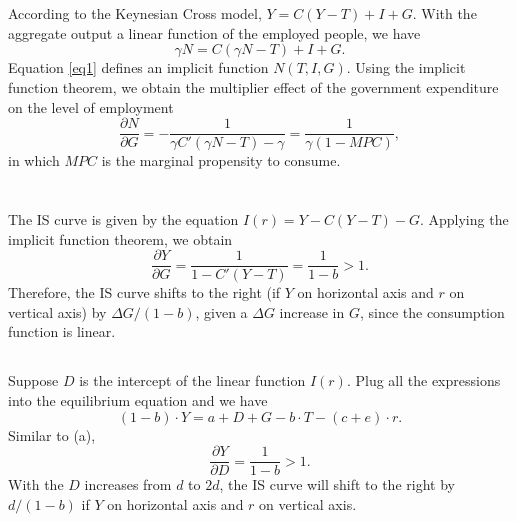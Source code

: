 \documentclass{article}
\begin{document}
\section{}
According to the Keynesian Cross model, $Y = C(Y - T) + I + G$. With the aggregate output a linear function of the employed people, we have
\begin{equation}
    \gamma N = C(\gamma N - T) + I + G.
    \label{eq1}
\end{equation}
Equation \eqref{eq1} defines an implicit function $N(T,I,G)$. Using the implicit function theorem, we obtain the multiplier effect of the government expenditure on the level of employment
\[
    \frac{\partial N}{\partial G} =
    -\frac{1}{\gamma C'(\gamma N - T) - \gamma} 
    = \frac{1}{\gamma (1 - MPC)},
\]
in which $MPC$ is the marginal propensity to consume.

\section{}
\subsection{}
The IS curve is given by the equation $I(r) = Y - C(Y - T) - G$. Applying the implicit function theorem, we obtain
\[
    \frac{\partial Y}{\partial G} = \frac{1}{1 - C'(Y-T)} = \frac{1}{1-b} > 1.
\]
Therefore, the IS curve shifts to the right (if $Y$ on horizontal axis and $r$ on vertical axis) by $\Delta G/(1-b)$, given a $\Delta G$ increase in $G$, since the consumption function is linear.

\subsection{}
Suppose $D$ is the intercept of the linear function $I(r)$. Plug all the expressions into the equilibrium equation and we have
\[
    (1 - b) \cdot Y = a + D + G - b \cdot T - (c+e) \cdot r.
\]
Similar to (a),
\[
    \frac{\partial Y}{\partial D} = \frac{1}{1-b} > 1.
\]
With the $D$ increases from $d$ to $2d$, the IS curve will shift to the right by $d/(1-b)$ if $Y$ on horizontal axis and $r$ on vertical axis.

\newpage
\section{}
\end{document}
